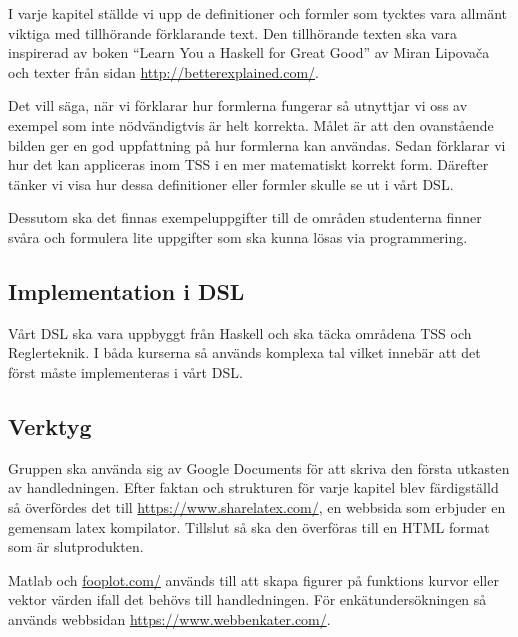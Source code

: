 \documentclass[]{article}
\begin{document}

I varje kapitel ställde vi upp de definitioner och formler som tycktes
vara allmänt viktiga med tillhörande förklarande text. Den tillhörande
texten ska vara inspirerad av boken ``Learn You a Haskell for Great
Good'' av Miran Lipovača \cite{learnyouahaskell} och texter från sidan
\url{http://betterexplained.com/}.

Det vill säga, när vi förklarar hur formlerna fungerar så utnyttjar vi
oss av exempel som inte nödvändigtvis är helt korrekta. Målet är
att den ovanstående bilden ger en god uppfattning på hur formlerna kan användas.
Sedan förklarar vi hur det kan appliceras inom TSS i en mer matematiskt korrekt form.
Därefter tänker vi visa hur dessa definitioner eller formler skulle se ut i vårt DSL.

Dessutom ska det finnas exempeluppgifter till de områden studenterna finner
svåra och formulera lite uppgifter som ska kunna lösas via programmering.

\subsection{Implementation i DSL}

Vårt DSL ska vara uppbyggt från Haskell och ska täcka områdena TSS och Reglerteknik.
I båda kurserna så används komplexa tal vilket innebär att det först måste implementeras i vårt DSL.

\subsection{Verktyg}%
Gruppen ska använda sig av Google Documents för att skriva den första utkasten av handledningen.
Efter faktan och strukturen för varje kapitel blev färdigställd så överfördes det till
\url{https://www.sharelatex.com/}, en webbsida som erbjuder en gemensam latex kompilator.
Tillslut så ska den överföras till en HTML format som är slutprodukten.

Matlab och \url{fooplot.com/} används till att skapa figurer på funktions kurvor eller vektor
värden ifall det behövs till handledningen. För enkätundersökningen så används webbsidan
\url{https://www.webbenkater.com/}.
\end{document}
